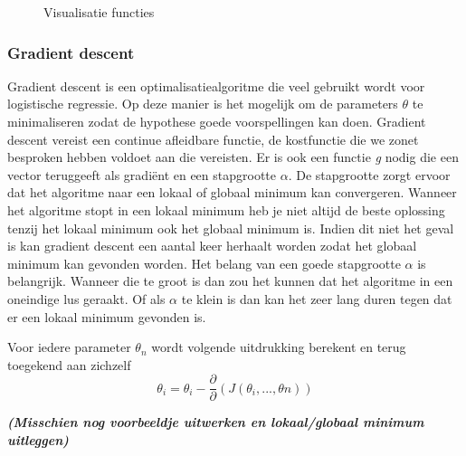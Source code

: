 \begin{figure}
	\centering
	\caption{Visualisatie functies}
	\label{fig:kostfunctie}
\end{figure}


\subsubsection{Gradient descent}
\label{sec:gradient-descent}
Gradient descent is een optimalisatiealgoritme die veel gebruikt wordt voor logistische regressie. Op deze manier is het mogelijk om de parameters $\theta$ te minimaliseren zodat de hypothese goede voorspellingen kan doen.
Gradient descent vereist een continue afleidbare functie, de kostfunctie die we zonet besproken hebben voldoet aan die vereisten. Er is ook een functie \textit{g} nodig die een vector teruggeeft als gradiënt en een stapgrootte $\alpha$. De stapgrootte zorgt ervoor dat het algoritme naar een lokaal of globaal minimum kan convergeren. Wanneer het algoritme stopt in een lokaal minimum heb je niet altijd de beste oplossing tenzij het lokaal minimum ook het globaal minimum is. Indien dit niet het geval is kan gradient descent een aantal keer herhaalt worden zodat het globaal minimum kan gevonden worden. Het belang van een goede stapgrootte $\alpha$ is belangrijk. Wanneer die te groot is dan zou het kunnen dat het algoritme in een oneindige lus geraakt. Of als $\alpha$ te klein is dan kan het zeer lang duren tegen dat er een lokaal minimum gevonden is. 

Voor iedere parameter $\theta_{n}$ wordt volgende uitdrukking berekent en terug toegekend aan zichzelf
$$
\theta_{i} = \theta_{i} - \frac{\partial}{\partial}(J(\theta_{i}, ... , \theta{n}))
$$

\textbf{\textit{(Misschien nog voorbeeldje uitwerken en lokaal/globaal minimum uitleggen)}}




